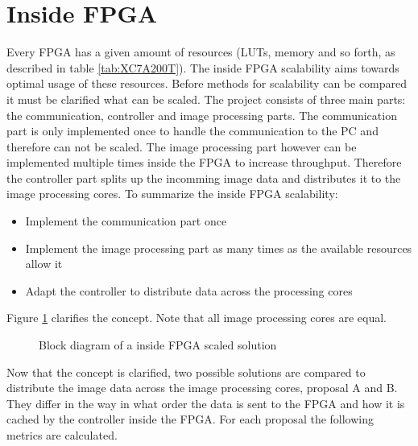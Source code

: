 \section{Inside FPGA} \label{chapt:sca:inside}
Every FPGA has a given amount of resources (LUTs, memory and so forth, as
described in table \ref{tab:XC7A200T}). The inside FPGA scalability aims towards
optimal usage of these resources. Before methods for scalability can be
compared it must be clarified what can be scaled. The project
consists of three main parts: the communication, controller and image processing
parts. The communication part is only implemented once to handle the
communication to the PC and therefore can not be scaled. The image processing
part however can be implemented multiple times inside the FPGA to increase
throughput. Therefore the controller part splits up the incomming image data and
distributes it to the image processing cores. To summarize the inside FPGA
scalability:
\begin{itemize}
    \item Implement the communication part once
    \item Implement the image processing part as many times as the available
    resources allow it
    \item Adapt the controller to distribute data across the processing cores
\end{itemize}

Figure \ref{fig:insidefpgascaleconceptbd} clarifies the concept. Note that all
image processing cores are equal.

\begin{figure}[tb!]
    \centering
    \begin{adjustbox}{max height=5cm}
        
    \end{adjustbox}
    \caption{Block diagram of a inside FPGA scaled solution}
    \label{fig:insidefpgascaleconceptbd}
\end{figure}

Now that the concept is clarified, two possible solutions are compared to
distribute the image data across the image processing cores, proposal A and B.
They differ in the way in what order the data is sent to the FPGA and how it is
cached by the controller inside the FPGA. For each proposal the following
metrics are calculated.

